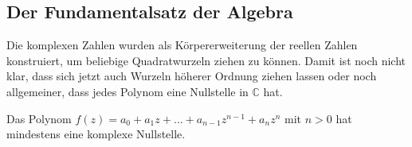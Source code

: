 %
%
%
\subsection{Der Fundamentalsatz der Algebra
\label{buch:analytisch:ganz:subsection:fundamentalsatz}}
Die komplexen Zahlen wurden als Körpererweiterung der reellen Zahlen
konstruiert, um beliebige Quadratwurzeln ziehen zu können.
Damit ist noch nicht klar, dass sich jetzt auch Wurzeln höherer
Ordnung ziehen lassen oder noch allgemeiner, dass jedes Polynom
eine Nullstelle in $\mathbb{C}$ hat.

\begin{satz}
\label{buch:analytisch:ganz:satz:fundamentalsatz}
%
Das Polynom $f(z) = a_0 + a_1z + \ldots + a_{n-1}z^{n-1} + a_nz^n$ mit
$n>0$ hat mindestens eine komplexe Nullstelle.
\end{satz}


